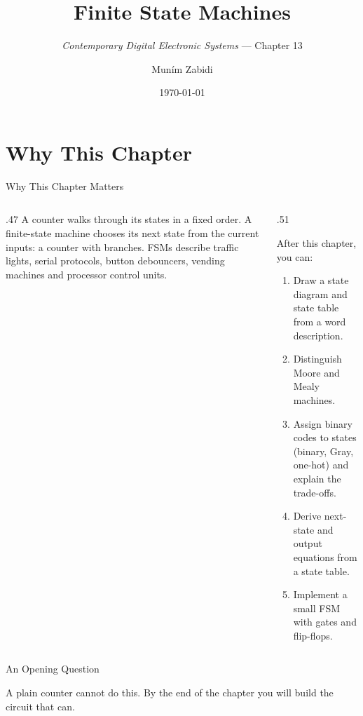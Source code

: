 \documentclass[9pt,aspectratio=169,xcolor=table]{beamer}
\title{Finite State Machines}
\subtitle{\emph{Contemporary Digital Electronic Systems} --- Chapter 13}
\author{Mun\'{i}m Zabidi}
\institute{\color{primary}Faculty of Electrical Engineering, Universiti Teknologi Malaysia}
\date{\today}
\begin{document}
\titlepage

\section{Why This Chapter}

\begin{frame}{Why This Chapter Matters}
  \begin{columns}[c]
  \begin{column}{.47\textwidth}
    A counter walks through its states in a fixed order. A \alert{finite-state machine} chooses its next state from the current inputs: a counter with branches. FSMs describe traffic lights, serial protocols, button debouncers, vending machines and processor control units.
  \end{column}
  \begin{column}{.51\textwidth}
    \begin{block}{After this chapter, you can:}
    {\small
    \begin{enumerate}\itemsep2pt
      \item Draw a state diagram and state table from a word description.
      \item Distinguish Moore and Mealy machines.
      \item Assign binary codes to states (binary, Gray, one-hot) and explain the trade-offs.
      \item Derive next-state and output equations from a state table.
      \item Implement a small FSM with gates and flip-flops.
    \end{enumerate}}
    \end{block}
  \end{column}
  \end{columns}
\end{frame}

\begin{frame}{An Opening Question}
  \leavevmode\vspace{4mm}
  \begin{center}
  \end{center}
  \vspace{4mm}
  A plain counter cannot do this. By the end of the chapter you will build the circuit that can.
\end{frame}
\end{document}
